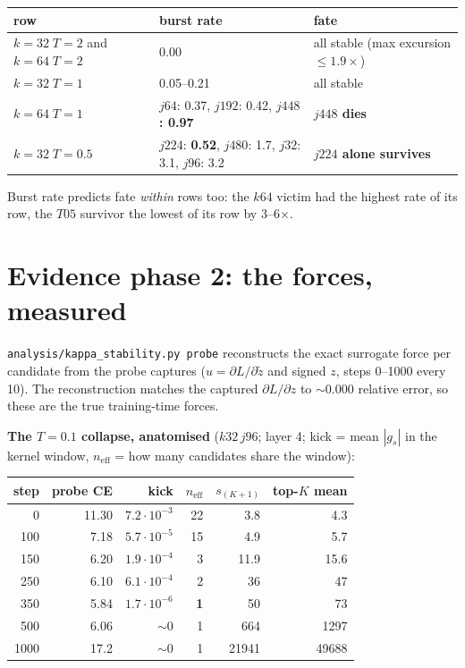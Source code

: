 \documentclass[11pt,a4paper]{article}
\newcommand{\code}[1]{\texttt{#1}}
\newcommand{\neff}{n_{\mathrm{eff}}}
\newcommand{\died}[1]{\textcolor{red!70!black}{\textbf{#1}}}
\begin{document}
\begin{center}\small
\begin{tabular}{lll}
\toprule
row & burst rate & fate \\
\midrule
$k{=}32\;T{=}2$ and $k{=}64\;T{=}2$ & 0.00 & all stable (max excursion $\le1.9\times$) \\
$k{=}32\;T{=}1$ & 0.05--0.21 & all stable \\
$k{=}64\;T{=}1$ & $j64$: 0.37, $j192$: 0.42, \textbf{$j448$: 0.97} & \died{$j448$ dies} \\
$k{=}32\;T{=}0.5$ & $j224$: \textbf{0.52}, $j480$: 1.7, $j32$: 3.1, $j96$: 3.2 & \textbf{$j224$ alone survives} \\
\bottomrule
\end{tabular}
\end{center}

Burst rate predicts fate \emph{within} rows too: the $k64$ victim had the
highest rate of its row, the $T05$ survivor the lowest of its row by
3--6$\times$.

\section{Evidence phase 2: the forces, measured}

\code{analysis/kappa\_stability.py probe} reconstructs the exact surrogate
force per candidate from the probe captures ($u = \partial L/\partial\tilde z$
and signed $z$, steps 0--1000 every 10). The reconstruction matches the
captured $\partial L/\partial z$ to ${\sim}0.000$ relative error, so these are
the true training-time forces.

\textbf{The $T{=}0.1$ collapse, anatomised} ($k32\,j96$; layer 4; kick = mean
$|g_s|$ in the kernel window, $\neff$ = how many candidates share the window):

\begin{center}\small
\begin{tabular}{rrrrrr}
\toprule
step & probe CE & kick & $\neff$ & $s_{(K+1)}$ & top-$K$ mean \\
\midrule
0    & 11.30 & $7.2\cdot10^{-3}$ & 22 & 3.8 & 4.3 \\
100  & 7.18  & $5.7\cdot10^{-5}$ & 15 & 4.9 & 5.7 \\
150  & 6.20  & $1.9\cdot10^{-4}$ & 3  & 11.9 & 15.6 \\
250  & 6.10  & $6.1\cdot10^{-4}$ & 2  & 36 & 47 \\
350  & 5.84  & $1.7\cdot10^{-6}$ & \textbf{1} & 50 & 73 \\
500  & 6.06  & ${\sim}0$ & 1 & 664 & 1297 \\
1000 & 17.2  & ${\sim}0$ & 1 & 21941 & 49688 \\
\bottomrule
\end{tabular}
\end{center}
\end{document}
